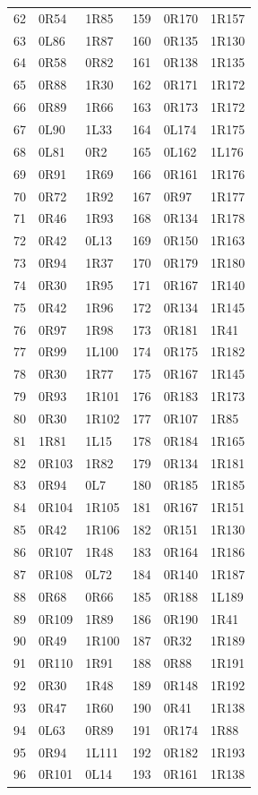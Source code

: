 \begin{longtable}{@{}rll@{\hspace{2.5em}}rll@{}}
62 & 0R54 & 1R85 & 159 & 0R170 & 1R157 \\
63 & 0L86 & 1R87 & 160 & 0R135 & 1R130 \\
64 & 0R58 & 0R82 & 161 & 0R138 & 1R135 \\
65 & 0R88 & 1R30 & 162 & 0R171 & 1R172 \\
66 & 0R89 & 1R66 & 163 & 0R173 & 1R172 \\
67 & 0L90 & 1L33 & 164 & 0L174 & 1R175 \\
68 & 0L81 & 0R2 & 165 & 0L162 & 1L176 \\
69 & 0R91 & 1R69 & 166 & 0R161 & 1R176 \\
70 & 0R72 & 1R92 & 167 & 0R97 & 1R177 \\
71 & 0R46 & 1R93 & 168 & 0R134 & 1R178 \\
72 & 0R42 & 0L13 & 169 & 0R150 & 1R163 \\
73 & 0R94 & 1R37 & 170 & 0R179 & 1R180 \\
74 & 0R30 & 1R95 & 171 & 0R167 & 1R140 \\
75 & 0R42 & 1R96 & 172 & 0R134 & 1R145 \\
76 & 0R97 & 1R98 & 173 & 0R181 & 1R41 \\
77 & 0R99 & 1L100 & 174 & 0R175 & 1R182 \\
78 & 0R30 & 1R77 & 175 & 0R167 & 1R145 \\
79 & 0R93 & 1R101 & 176 & 0R183 & 1R173 \\
80 & 0R30 & 1R102 & 177 & 0R107 & 1R85 \\
81 & 1R81 & 1L15 & 178 & 0R184 & 1R165 \\
82 & 0R103 & 1R82 & 179 & 0R134 & 1R181 \\
83 & 0R94 & 0L7 & 180 & 0R185 & 1R185 \\
84 & 0R104 & 1R105 & 181 & 0R167 & 1R151 \\
85 & 0R42 & 1R106 & 182 & 0R151 & 1R130 \\
86 & 0R107 & 1R48 & 183 & 0R164 & 1R186 \\
87 & 0R108 & 0L72 & 184 & 0R140 & 1R187 \\
88 & 0R68 & 0R66 & 185 & 0R188 & 1L189 \\
89 & 0R109 & 1R89 & 186 & 0R190 & 1R41 \\
90 & 0R49 & 1R100 & 187 & 0R32 & 1R189 \\
91 & 0R110 & 1R91 & 188 & 0R88 & 1R191 \\
92 & 0R30 & 1R48 & 189 & 0R148 & 1R192 \\
93 & 0R47 & 1R60 & 190 & 0R41 & 1R138 \\
94 & 0L63 & 0R89 & 191 & 0R174 & 1R88 \\
95 & 0R94 & 1L111 & 192 & 0R182 & 1R193 \\
96 & 0R101 & 0L14 & 193 & 0R161 & 1R138 \\
\bottomrule\end{longtable}
\normalfont\normalsize
